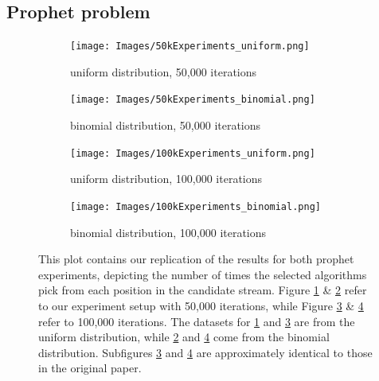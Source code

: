\subsection{Prophet problem}
\label{sec:prophet_results}

\begin{figure}[h!]
  \begin{subfigure}[t]{.5\textwidth}
    \centering
    \texttt{[image: Images/50kExperiments\_uniform.png]}
    \caption{uniform distribution, 50,000 iterations}
    \label{fig:prophet_50k_uniform}
  \end{subfigure}
  \hfill
  \begin{subfigure}[t]{.5\textwidth}
    \centering
    \texttt{[image: Images/50kExperiments\_binomial.png]}
    \caption{binomial distribution, 50,000 iterations}
    \label{fig:prophet_50k_binomial}
  \end{subfigure}

  \medskip

  \begin{subfigure}[t]{.5\textwidth}
    \centering
    \texttt{[image: Images/100kExperiments\_uniform.png]}
    \caption{uniform distribution, 100,000 iterations}
    \label{fig:prophet_100k_uniform}
  \end{subfigure}
  \hfill
  \begin{subfigure}[t]{.5\textwidth}
    \centering
    \texttt{[image: Images/100kExperiments\_binomial.png]}
    \caption{binomial distribution, 100,000 iterations}
    \label{fig:prophet_100k_binomial}
  \end{subfigure}
  \caption{This plot contains our replication of the results for both prophet experiments, depicting the number of times the selected algorithms pick from each position in the candidate stream. Figure \ref{fig:prophet_50k_uniform} \& \ref{fig:prophet_50k_binomial} refer to our experiment setup with 50,000 iterations, while Figure \ref{fig:prophet_100k_uniform} \& \ref{fig:prophet_100k_binomial} refer to 100,000 iterations. The datasets for \ref{fig:prophet_50k_uniform} and \ref{fig:prophet_100k_uniform} are from the uniform distribution, while \ref{fig:prophet_50k_binomial} and \ref{fig:prophet_100k_binomial} come from the binomial distribution. Subfigures \ref{fig:prophet_100k_uniform} and \ref{fig:prophet_100k_binomial} are approximately identical to those in the original paper.}
  \label{fig:resultsProphet}
\end{figure}

